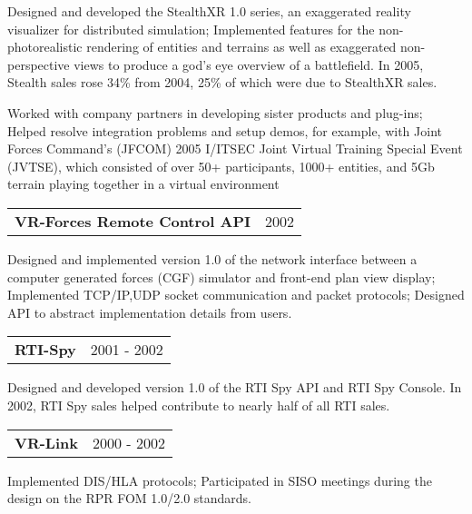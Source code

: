 Designed and developed the StealthXR 1.0 series, an exaggerated reality visualizer for distributed simulation; Implemented features for the non-photorealistic rendering of entities and terrains as well as exaggerated non-perspective views to produce a god's eye overview of a battlefield.  In 2005, Stealth sales rose 34\% from 2004, 25\% of which were due to StealthXR sales. 

Worked with company partners in developing sister products and plug-ins; Helped resolve integration problems and setup demos, for example, with Joint Forces Command's (JFCOM) 2005 I/ITSEC Joint Virtual Training Special Event (JVTSE), which consisted of over 50+ participants, 1000+ entities, and 5Gb terrain playing together in a virtual environment
\medskip

\needspace{6em}
\begin{tabular*}{7.1in}{@{}l@{\extracolsep\fill}r}
{\bf VR-Forces Remote Control API} & 2002\\
\end{tabular*}
Designed and implemented version 1.0 of the network interface between a computer generated forces (CGF) simulator and front-end plan view display; Implemented TCP/IP,UDP socket communication and packet protocols; Designed API to abstract implementation details from users.
\medskip

\needspace{6em}
\begin{tabular*}{7.1in}{@{}l@{\extracolsep\fill}r}
{\bf RTI-Spy} & 2001 - 2002\\
\end{tabular*}
Designed and developed version 1.0 of the RTI Spy API and RTI Spy Console.  In 2002, RTI Spy sales helped contribute to nearly half of all RTI sales.
\medskip

\needspace{6em}
\begin{tabular*}{7.1in}{@{}l@{\extracolsep\fill}r}
{\bf VR-Link} & 2000 - 2002\\
\end{tabular*}
Implemented DIS/HLA protocols; Participated in SISO meetings during the design on the RPR FOM 1.0/2.0 standards.


